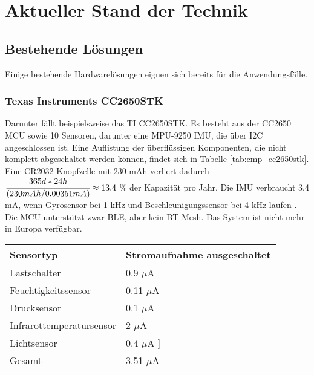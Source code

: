 

\chapter{Aktueller Stand der Technik}

\section{Bestehende Lösungen}
Einige bestehende Hardwarelösungen eignen sich bereits für die Anwendungsfälle.

\subsection{Texas Instruments CC2650STK}
Darunter fällt beispielsweise das TI CC2650STK.
Es besteht aus der CC2650 MCU sowie 10 Sensoren, darunter eine MPU-9250 IMU, die über I2C angeschlossen ist.
Eine Auflistung der überflüssigen Komponenten, die nicht komplett abgeschaltet werden können, findet sich in Tabelle \ref{tab:cmp_cc2650stk}.
Eine CR2032 Knopfzelle mit 230 mAh verliert dadurch $\cfrac{365d*24h}{(230mAh/0.00351mA)} \approx 13.4$ \% der Kapazität pro Jahr.
Die IMU verbraucht 3.4 mA, wenn Gyrosensor bei 1 kHz und Beschleunigungssensor bei 4 kHz laufen \cite{datasheet_mpu9250}.
Die MCU unterstützt zwar BLE, aber kein BT Mesh.
Das System ist nicht mehr in Europa verfügbar. \cite{site_cc2650stk}

\begin{minipage}{\linewidth}
	\label{tab:cmp_cc2650stk}
	\begin{tabularx}{\linewidth}{X|X}
    Sensortyp & Stromaufnahme ausgeschaltet\\
    \hline
    Lastschalter & 0.9 $\mu$A \cite{datasheet_tps2291}\\
    Feuchtigkeitssensor & 0.11 $\mu$A \cite{datasheet_hdc1000}\\
    Drucksensor & 0.1 $\mu$A \cite{datasheet_bmp280}\\
    Infrarottemperatursensor & 2 $\mu$A \cite{site_tmp007}\\
    Lichtsensor & 0.4 $\mu$A \cite{datasheet_opt3001}]\\
    \hline
    Gesamt & 3.51 $\mu$A\\
  \end{tabularx}
\end{minipage}

